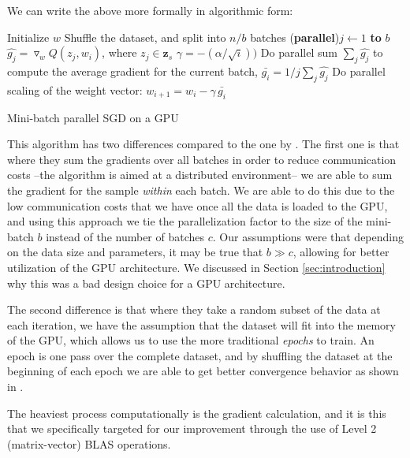 \documentclass[11pt,a4paper]{article}
\begin{document}
We can write the above more formally in algorithmic form:

\begin{algorithm}
	\DontPrintSemicolon %
	Initialize $w$\;
	 {
		Shuffle the dataset, and split into $n/b$ batches\;
		 {
			\For(\textbf{parallel}){$j \gets 1$ \textbf{to} $b$} {
				$\hat{g_j} = \triangledown_w Q(z_j, w_i)$, where $z_j \in \mathbf{z}_s$\;
			}
			$\gamma = -(\alpha / \sqrt{i}))$\;
			Do parallel sum $\sum_j{\hat{g_j}}$ to compute the average gradient for the current batch, $\bar{g_i} = 1/j \sum_j{\hat{g_j}}$\;
			Do parallel scaling of the weight vector: $w_{i + 1} = w_i - \gamma \,  \bar{g_i}$\;
		}
	}
	\;
	\caption{Mini-batch parallel SGD on a GPU}
	\label{algo:sgd-gpu}
\end{algorithm}

This algorithm has two differences compared to the one by \cite{dekel2012optimal}.
The first one is that where
they sum the gradients over all batches in order to reduce communication costs --the algorithm is
aimed at a distributed environment-- we are able to sum the gradient for the sample \textit{within}
each batch. We are able to do this due to the low communication costs that we have once all the
data is loaded to the GPU, and using this approach we tie the parallelization factor to the
size of the mini-batch $b$ instead of the number of batches $c$. Our assumptions were that depending 
on the data size and parameters, it may be true that $b \gg c$, allowing for better utilization of the GPU
architecture. We discussed in Section \ref{sec:introduction} why this was a bad design choice for a GPU
architecture.

The second difference is that where they take a random subset of the data at each iteration,
we have the assumption that the dataset will fit into the memory of the GPU, which allows us
to use the more traditional \textit{epochs} to train. An epoch is one pass over the complete
dataset, and by shuffling the dataset at the beginning of each epoch we are able to get better
convergence behavior as shown in \cite{bottou2010large}.

The heaviest process computationally is the gradient calculation, and it is this that we specifically targeted for our 
improvement through the use of Level 2 (matrix-vector) BLAS operations.
\end{document}
